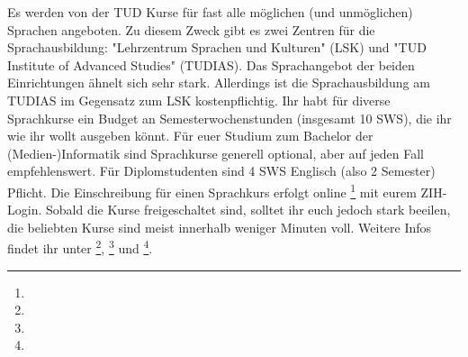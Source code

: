 Es werden von der TUD Kurse für fast alle möglichen (und unmöglichen) Sprachen angeboten. Zu diesem Zweck gibt es zwei Zentren für die Sprachausbildung: "Lehrzentrum Sprachen und Kulturen" (LSK) und "TUD Institute of Advanced Studies" (TUDIAS). Das Sprachangebot der beiden Einrichtungen ähnelt sich sehr stark. Allerdings ist die Sprachausbildung am TUDIAS im Gegensatz zum LSK kostenpflichtig. Ihr habt für diverse Sprachkurse ein Budget an Semesterwochenstunden (insgesamt 10 SWS), die ihr wie ihr wollt ausgeben könnt. Für euer Studium zum Bachelor der (Medien-)Informatik sind Sprachkurse generell optional, aber auf jeden Fall empfehlenswert. Für Diplomstudenten sind 4 SWS Englisch (also 2 Semester) Pflicht. Die Einschreibung für einen Sprachkurs erfolgt online \footnote{} mit eurem ZIH-Login. Sobald die Kurse freigeschaltet sind, solltet ihr euch jedoch stark beeilen, die beliebten Kurse sind meist innerhalb weniger Minuten voll. Weitere Infos findet ihr unter \footnote{}, \footnote{} und \footnote{}.